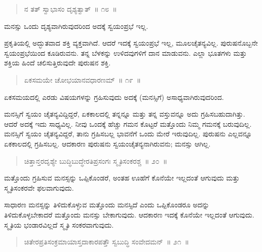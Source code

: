\vspace{-0.3cm}

\begin{verse}
ನ ತತ್​ ಸ್ವಾಭಾಸಂ ದೃಶ್ಯತ್ವಾತ್​~॥ ೧೮~॥
\end{verse}

\vspace{-0.3cm}

ಮನಸ್ಸು ಒಂದು ದೃಶ್ಯವಾಗಿರುವುದರಿಂದ ಅದಕ್ಕೆ ಸ್ವಯಂಪ್ರಭೆ ಇಲ್ಲ. 

ಪ್ರಕೃತಿಯಲ್ಲಿ ಅದ್ಭುತವಾದ ಶಕ್ತಿ ವ್ಯಕ್ತವಾಗಿದೆ. ಆದರೆ ಇದಕ್ಕೆ ಸ್ವಯಂಪ್ರಭೆ ಇಲ್ಲ, ಮೂಲಚೈತನ್ಯವಿಲ್ಲ. ಪುರುಷನೊಬ್ಬನೇ ಸ್ವಯಂಪ್ರಭೆಯಿಂದ ಕೂಡಿರುವನು. ತನ್ನ ಬೆಳಕನ್ನು ಉಳಿದವುಗಳಿಗೆ ದಾನ ಮಾಡುವನು. ಎಲ್ಲಾ ಭೂತಗಳು ಮತ್ತು ಶಕ್ತಿಯ ಹಿಂದೆ ಚಲಿಸುತ್ತಿರುವುದೇ ಪುರುಷನ ಶಕ್ತಿ. 

\vspace{-0.3cm}

\begin{verse}
ಏಕಸಮಯೇ ಚೋಭಯಾನವಧಾರಣಮ್​~॥ ೧೯~॥
\end{verse}

\vspace{-0.3cm}

ಏಕಸಮಯದಲ್ಲಿ ಎರಡು ವಿಷಯಗಳನ್ನು ಗ್ರಹಿಸುವುದು ಅದಕ್ಕೆ (ಮನಸ್ಸಿಗೆ) ಅಸಾಧ್ಯವಾಗಿರುವುದರಿಂದ. 

ಮನಸ್ಸಿಗೆ ಸ್ವಯಂ ಚೈತನ್ಯವಿದ್ದಿದ್ದರೆ, ಏಕಕಾಲದಲ್ಲಿ ತನ್ನನ್ನೂ ಮತ್ತು ತನ್ನ ವಸ್ತುವನ್ನೂ ಅದು ಗ್ರಹಿಸಬಹುದಾಗಿತ್ತು. ಆದರೆ ಅದಕ್ಕೆ ಇದು ಸಾಧ್ಯವಿಲ್ಲ. ನೀವು ಒಂದಕ್ಕೆ ಹೆಚ್ಚು ಗಮನ ಕೊಟ್ಟರೆ ಮತ್ತೊಂದು ನಿಮ್ಮ ಗಮನಕ್ಕೆ ಬರುವುದಿಲ್ಲ. ಮನಸ್ಸಿಗೆ ಸ್ವಯಂ ಚೈತನ್ಯವಿದ್ದರೆ, ತಾನು ಗ್ರಹಿಸಬಲ್ಲ ಭಾವನೆಗೆ ಒಂದು ಮೇರೆ ಇರುವುದಿಲ್ಲ. ಪುರುಷನು ಎಲ್ಲವನ್ನೂ ಏಕಕಾಲದಲ್ಲಿ ಗ್ರಹಿಸಬಲ್ಲ. ಆದಕಾರಣ ಪುರುಷನು ಸ್ವಯಂಚೈತನ್ಯನಾಗಿರುವನು; ಮನಸ್ಸು ಆಗಿಲ್ಲ. 

\vspace{-0.3cm}

\begin{verse}
ಚಿತ್ತಾನ್ತರದೃಶ್ಯೇ ಬುದ್ಧಿಬುದ್ಧೇರತಿಪ್ರಸಂಗಃ ಸ್ಮೃತಿಸಂಕರಶ್ಚ~॥ ೨೦~॥
\end{verse}

\vspace{-0.3cm}

ಮತ್ತೊಂದು ಗ್ರಹಿಸುವ ಮನಸ್ಸನ್ನು ಒಪ್ಪಿಕೊಂಡರೆ, ಅಂತಹ ಊಹೆಗೆ ಕೊನೆಯೇ ಇಲ್ಲದಂತೆ ಆಗುವುದು ಮತ್ತು ಸ್ಮೃತಿಸಂಕರವೇ ಫಲವಾಗುವುದು. 

ಸಾಧಾರಣ ಮನಸ್ಸನ್ನು ತಿಳಿದುಕೊಳ್ಳುವ ಮತ್ತೊಂದು ಮನಸ್ಸಿದೆ ಎಂದು ಒಪ್ಪಿಕೊಂಡರೂ ಅದನ್ನು ತಿಳಿದುಕೊಳ್ಳಬೇಕಾದರೆ ಮತ್ತೊಂದು ಮನಸ್ಸು ಬೇಕಾಗುವುದು. ಆದಕಾರಣ ಇದಕ್ಕೆ ಕೊನೆಯೇ ಇಲ್ಲದಂತೆ ಆಗುವುದು. ಸ್ಮೃತಿಯ ಭಂಡಾರವಿಲ್ಲದೆ ಸ್ಮೃತಿ ಸಂಕರವಾಗುವುದು. 

\vspace{-0.3cm}

\begin{verse}
ಚಿತೇರಪ್ರತಿಸಂಕ್ರಮಾಯಾಸ್ತದಾಕಾರಪತ್ತೌ ಸ್ವಬುದ್ಧಿ ಸಂವೇದಮನ್​~॥ ೨೧~॥
\end{verse}

